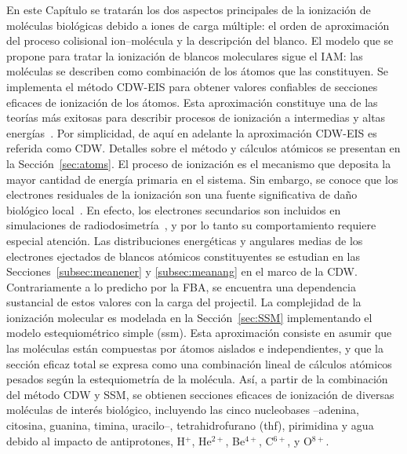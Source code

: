 En este Capítulo se tratarán los dos aspectos principales de la 
ionización de moléculas biológicas debido a iones de carga múltiple: el 
orden de aproximación del proceso colisional ion--molécula y la 
descripción del blanco. El modelo que se propone para tratar la 
ionización de blancos moleculares sigue el IAM: las moléculas se 
describen como combinación de los átomos que las constituyen. Se 
implementa el método CDW-EIS para obtener valores confiables de 
secciones eficaces de ionización de los átomos. Esta aproximación 
constituye una de las teorías más exitosas para describir procesos de 
ionización a intermedias y altas energías~\cite{Miraglia:08,Miraglia:09}. 
Por simplicidad, de aquí en adelante la aproximación CDW-EIS es
referida como CDW. Detalles sobre el método y cálculos atómicos se 
presentan en la Sección~\ref{sec:atoms}. El proceso de ionización es el 
mecanismo que deposita la mayor cantidad de energía primaria en el 
sistema. Sin embargo, se conoce que los electrones residuales de la 
ionización son una fuente significativa de daño biológico 
local~\cite{Denifl:11}. En efecto, los electrones secundarios son 
incluidos en simulaciones de radiodosimetría~\cite{Champion:15,
Quinto:17,Acocer-Avila:19}, y por lo tanto su comportamiento requiere 
especial atención. Las distribuciones energéticas y angulares medias de 
los electrones ejectados de blancos atómicos constituyentes se estudian 
en las Secciones~\ref{subsec:meanener} y \ref{subsec:meanang} en el 
marco de la CDW. Contrariamente a lo predicho por la FBA, se encuentra 
una dependencia sustancial de estos valores con la carga del projectil. 
La complejidad de la ionización molecular es modelada en la  
Sección~\ref{sec:SSM} implementando el modelo estequiométrico simple 
(\acs{ssm}). Esta aproximación consiste en asumir que las moléculas están 
compuestas por átomos aislados e independientes, y que la sección eficaz 
total se expresa como una combinación lineal de cálculos atómicos 
pesados según la estequiometría de la molécula. Así, a partir de la 
combinación del método CDW y SSM, se obtienen secciones eficaces de 
ionización de diversas moléculas de interés biológico, incluyendo las 
cinco nucleobases --adenina, citosina, guanina, timina, uracilo--, 
tetrahidrofurano (\acs{thf}), pirimidina y agua debido al impacto de 
antiprotones, H$^{+}$, He$^{2+}$, Be$^{4+}$, C$^{6+}$, y O$^{8+}$. 


